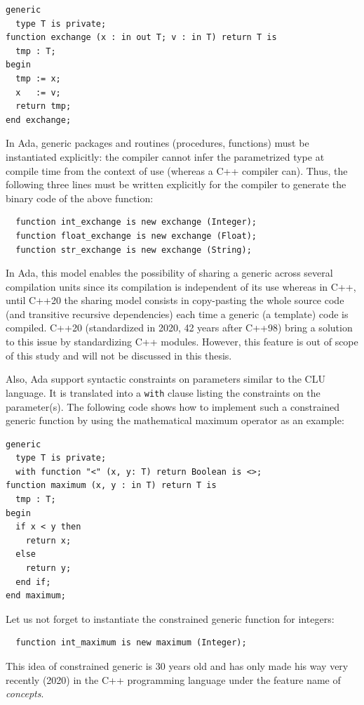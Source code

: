 \begin{verbatim}
generic
  type T is private;
function exchange (x : in out T; v : in T) return T is
  tmp : T;
begin
  tmp := x;
  x   := v;
  return tmp;
end exchange;
\end{verbatim}

In Ada, generic packages and routines (procedures, functions) must be instantiated explicitly: the compiler cannot infer
the parametrized type at compile time from the context of use (whereas a C++ compiler can). Thus, the following three
lines must be written explicitly for the compiler to generate the binary code of the above function:
\begin{verbatim}
  function int_exchange is new exchange (Integer);
  function float_exchange is new exchange (Float);
  function str_exchange is new exchange (String);
\end{verbatim}

In Ada, this model enables the possibility of sharing a generic across several compilation units since its compilation is
independent of its use whereas in C++, until C++20 the sharing model consists in copy-pasting the whole source code
(and transitive recursive dependencies) each time a generic (a template) code is compiled. C++20 (standardized in 2020,
42 years after C++98) bring a solution to this issue by standardizing C++ modules. However, this feature is out of scope
of this study and will not be discussed in this thesis.

Also, Ada support syntactic constraints on parameters similar to the CLU language. It is translated into a \texttt{with}
clause listing the constraints on the parameter(s). The following code shows how to implement such a constrained generic
function by using the mathematical maximum operator as an example:

\begin{verbatim}
generic
  type T is private;
  with function "<" (x, y: T) return Boolean is <>;
function maximum (x, y : in T) return T is
  tmp : T;
begin
  if x < y then
    return x;
  else
    return y;
  end if;
end maximum;
\end{verbatim}

Let us not forget to instantiate the constrained generic function for integers:

\begin{verbatim}
  function int_maximum is new maximum (Integer);
\end{verbatim}

This idea of constrained generic is 30 years old and has only made his way very recently (2020) in the C++ programming
language under the feature name of \emph{concepts}.


